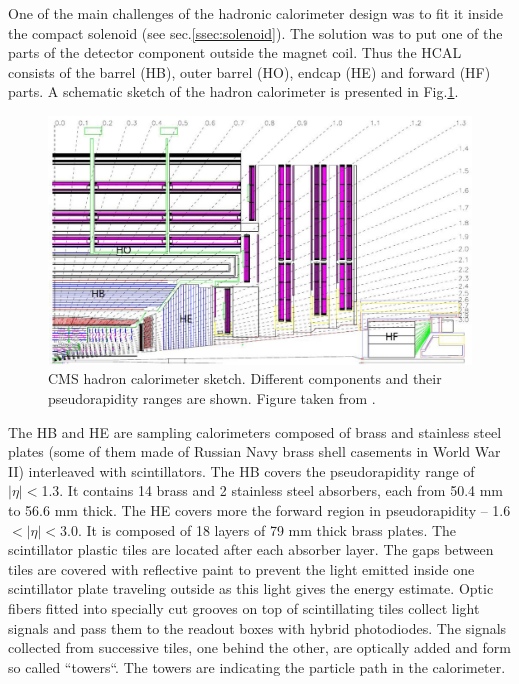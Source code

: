 One of the main challenges of the hadronic calorimeter design was to fit it inside the compact solenoid (see sec.\ref{ssec:solenoid}).
The solution was to put one of the parts of the detector component outside the magnet coil. Thus the HCAL consists of the barrel (HB), 
outer barrel (HO), endcap (HE) and forward (HF) parts. A schematic sketch of the hadron calorimeter is presented in Fig.\ref{fig:hcal}.

\begin{figure}[t]
  \centering
  \includegraphics[width=1.0\textwidth]{02_experimental_setup/plots/Figures_Experimental_Apparatus_HCAL.png}
  \caption{CMS hadron calorimeter sketch. Different components and their pseudorapidity ranges are shown. Figure taken from \cite{XDAQ}.}
  \label{fig:hcal}
\end{figure}

The HB and HE are sampling calorimeters composed of brass and stainless steel plates (some of them made of Russian Navy brass 
shell casements in World War II) interleaved with scintillators. The HB covers the pseudorapidity range of $|\eta| < $1.3. It contains 14 brass and
2 stainless steel absorbers, each from 50.4 mm to 56.6 mm thick. The HE covers more the forward region in pseudorapidity -- 1.6$ < |\eta| < $3.0. It is composed
of 18 layers of 79 mm thick brass plates. The scintillator plastic tiles are located after each absorber layer. The gaps between tiles are covered 
with reflective paint to prevent the light emitted inside one scintillator plate traveling outside as this light gives the energy estimate. Optic fibers fitted into
specially cut grooves on top of scintillating tiles collect light signals and pass them to the readout boxes with hybrid photodiodes. The signals
collected from successive tiles, one behind the other, are optically added and form so called ``towers``. The towers are indicating 
the particle path in the calorimeter.

